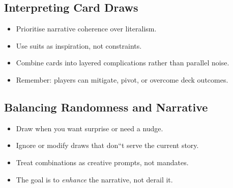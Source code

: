 \subsection{Interpreting Card Draws}\label{subsec:card_interpretation}
\begin{itemize}
    \item Prioritise narrative coherence over literalism.
    \item Use suits as inspiration, not constraints.
    \item Combine cards into layered complications rather than parallel noise.
    \item Remember: players can mitigate, pivot, or overcome deck outcomes.
\end{itemize}

\subsection{Balancing Randomness and Narrative}\label{subsec:balancing_randomness}
\begin{itemize}
    \item Draw when you want surprise or need a nudge.
    \item Ignore or modify draws that don``t serve the current story.
    \item Treat combinations as creative prompts, not mandates.
    \item The goal is to \emph{enhance} the narrative, not derail it.
\end{itemize}

